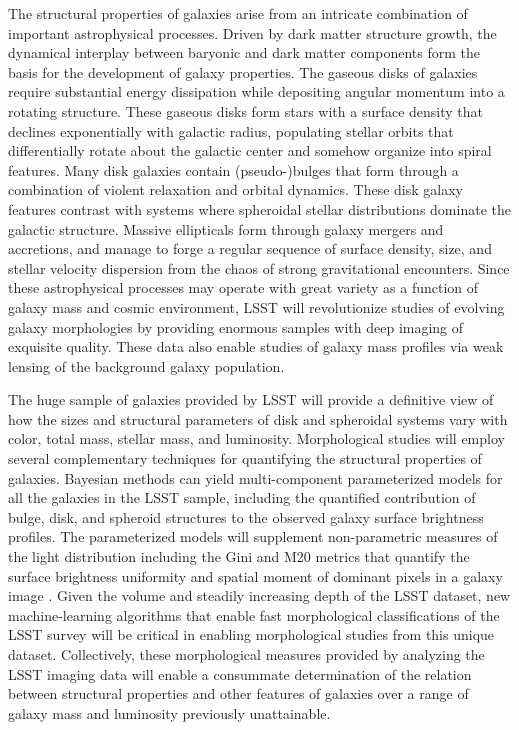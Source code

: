 {The structural properties of galaxies arise from
an intricate combination of important astrophysical
processes. Driven by dark matter structure growth, the dynamical
interplay between baryonic and dark matter components form
the basis for the development of galaxy properties.
The gaseous disks of galaxies require
substantial energy dissipation while depositing
angular momentum into a rotating structure. These
gaseous disks form stars with a
surface density that declines exponentially with
galactic radius, populating stellar orbits that
differentially rotate about the galactic center and
somehow organize into spiral features.
Many disk galaxies contain (pseudo-)bulges that form through
a combination of violent relaxation and orbital dynamics.
These disk galaxy features contrast with systems where
spheroidal stellar distributions dominate the galactic
structure. Massive ellipticals form through galaxy
mergers and accretions, and manage to forge a regular
sequence of surface density, size, and stellar velocity
dispersion from the chaos of strong gravitational
encounters. Since these astrophysical
processes may operate with great
variety as a function of galaxy mass and
cosmic environment, LSST will revolutionize studies
of evolving galaxy morphologies by providing enormous
samples with deep imaging of exquisite quality. These data also enable 
studies of galaxy mass profiles via weak lensing of the background
galaxy population.

The huge sample of galaxies provided by LSST will
provide a definitive view of how the sizes and
structural parameters of disk and spheroidal systems
vary with color, total mass, stellar mass, and luminosity. 
Morphological studies will employ several complementary techniques for quantifying the 
structural properties of galaxies. Bayesian
methods can yield multi-component
parameterized models for all the galaxies
in the LSST sample, including the quantified
contribution of bulge, disk, and
spheroid structures to the observed galaxy
surface brightness profiles. The parameterized
models will supplement non-parametric measures
of the light distribution including the
Gini and M20 metrics that quantify the surface
brightness uniformity and spatial moment of
dominant pixels in a galaxy image \citep{abraham2003a,lotz2004a}. Given the volume 
and steadily increasing depth of the LSST dataset, 
new machine-learning algorithms \citep[e.g.][; Hausen \& Robertson, in prep]{hocking2015a} that enable fast morphological classifications of the LSST survey will be critical in enabling morphological studies from this unique dataset. Collectively, these morphological measures provided
by analyzing the LSST imaging data will enable
a consummate determination of the relation between
structural properties and other features of
galaxies over a range of galaxy mass and luminosity
previously unattainable. 

}
